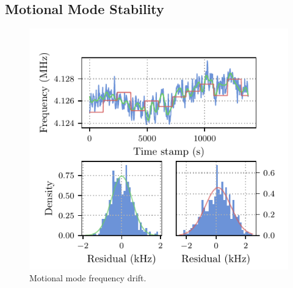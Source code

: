 \subsection{Motional Mode Stability}
\label{sec:Motional Mode Stability}

    \begin{figure}
        \begin{center}
        \noindent\includegraphics[width=\linewidth]{
            figures/pdf_figure/mode_drift.pdf
            }
        \end{center}
        \caption{
            Motional mode frequency drift.
            }
        \label{fig:mode drift}
    \end{figure}

